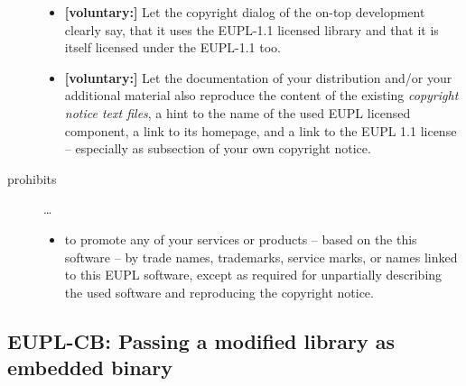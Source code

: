 \begin{description}
\begin{itemize}
  \item \textbf{[voluntary:]} Let the copyright dialog of the on-top development
  clearly say, that it uses the EUPL-1.1 licensed library and that it is itself
  licensed under the EUPL-1.1 too.
  
  \item \textbf{[voluntary:]} Let the documentation of your distribution and/or
  your additional material  also reproduce the content of the existing
  \emph{copyright notice text files}, a hint to the name of the used EUPL
  licensed component, a link to its homepage, and a link to the EUPL 1.1 license
  -- especially as subsection of your own copyright notice.
 
\end{itemize}

\item[prohibits] \ldots
\begin{itemize}
  \item to promote any of your services or products -- based on the this software
  -- by trade names, trademarks, service marks, or names linked to this EUPL
  software, except as required for unpartially describing the used software and
  reproducing the copyright notice.
\end{itemize}

\end{description}


\subsection{EUPL-CB: Passing a modified library as embedded binary}
\label{OSUC-10B-EUPL}

